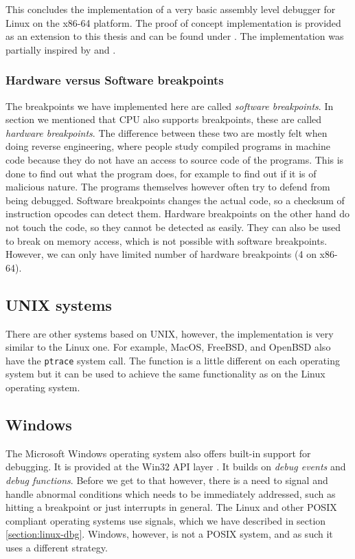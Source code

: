 This concludes the implementation of a very basic assembly level debugger for
Linux on the x86-64 platform. The proof of concept implementation is provided as
an extension to this thesis and can be found under . The implementation was partially inspired by
\cite{linux-debugger-blog} and \cite{lldb}.

\subsubsection*{Hardware versus Software breakpoints}
The breakpoints we have implemented here are called \textit{software
breakpoints}. In section  we mentioned that CPU also supports
breakpoints, these are called \textit{hardware breakpoints}. The difference
between these two are mostly felt when doing reverse engineering, where people
study compiled programs in machine code because they do not have an access to
source code of the programs. This is done to find out what the program does,
for example to find out if it is of malicious nature. The programs themselves
however often try to defend from being debugged. Software breakpoints changes
the actual code, so a checksum of instruction opcodes can detect them. Hardware
breakpoints on the other hand do not touch the code, so they cannot be detected
as easily. They can also be used to break on memory access, which is not
possible with software breakpoints. However, we can only have limited number of
hardware breakpoints (4 on x86-64).


\subsection{UNIX systems}
There are other systems based on UNIX, however, the implementation is very
similar to the Linux one. For example, MacOS, FreeBSD, and OpenBSD also have
the \texttt{ptrace} system call. The function is a little different on each
operating system but it can be used to achieve the same functionality as on the
Linux operating system.

\subsection{Windows}
The Microsoft Windows operating system also offers built-in support for
debugging. It is provided at the Win32 API layer
\cite{windows-msdn-debugging-api, windows-press-debugging-api}. It builds on
\textit{debug events} and \textit{debug functions}. Before we get to that
however, there is a need to signal and handle abnormal conditions which needs
to be immediately addressed, such as hitting a breakpoint or just interrupts in
general. The Linux and other POSIX compliant operating systems use signals,
which we have described in section \ref{section:linux-dbg}. Windows, however,
is not a POSIX system, and as such it uses a different strategy.

